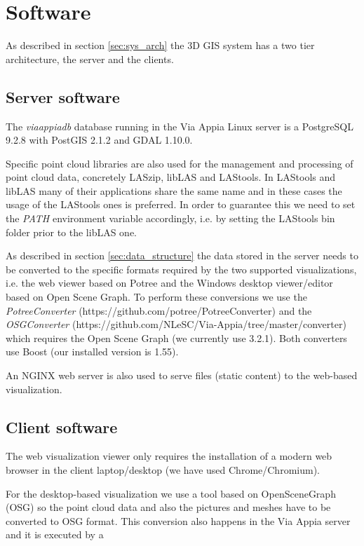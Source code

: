\section{Software}
\label{sec:software}

As described in section \ref{sec:sys_arch} the 3D GIS system has a two tier architecture, the server and the clients. 

\subsection{Server software}

The \textit{viaappiadb} database running in the Via Appia Linux server is a PostgreSQL 9.2.8 with PostGIS 2.1.2 and GDAL 1.10.0.

Specific point cloud libraries are also used for the management and processing of point cloud data, concretely LASzip, libLAS and LAStools. In LAStools and libLAS many of their applications share the same name and in these cases the usage of the LAStools ones is preferred. In order to guarantee this we need to set the \textit{PATH} environment variable accordingly, i.e. by setting the LAStools bin folder prior to the libLAS one.

As described in section \ref{sec:data_structure} the data stored in the server needs to be converted to the specific formats required by the two supported visualizations, i.e. the web viewer based on Potree and the Windows desktop viewer/editor based on Open Scene Graph. To perform these conversions we use the \textit{PotreeConverter} (https://github.com/potree/PotreeConverter) and the \textit{OSGConverter} (https://github.com/NLeSC/Via-Appia/tree/master/converter) which requires the Open Scene Graph (we currently use 3.2.1). Both converters use Boost (our installed version is 1.55).

An NGINX web server is also used to serve files (static content) to the web-based visualization. 

\subsection{Client software}

The web visualization viewer only requires the installation of a modern web browser in the client laptop/desktop (we have used Chrome/Chromium).

For the desktop-based visualization we use a tool based on OpenSceneGraph (OSG) so the point cloud data and also the pictures and meshes have to be converted to OSG format. This conversion also happens in the Via Appia server and it is executed by a

